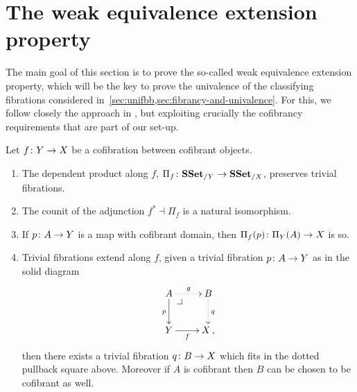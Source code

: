 \documentclass[reqno,10pt,a4paper,oneside,draft]{amsart}
\begin{document}
\section{The weak equivalence extension property}
\label{sec:equep}

The main goal of this section is to prove the so-called weak equivalence extension property, which will be the key to prove the univalence of the classifying fibrations considered in~\cref{sec:unifbb,sec:fibrancy-and-univalence}.  For this, we follow closely the approach in \cite{voevodsky-simplicial-model}, but exploiting crucially the cofibrancy requirements that are part of our set-up.



\begin{lemma}\label{Lemma:ForTheExtProperty} Let  $f \colon Y \rightarrow X$ be a cofibration between
cofibrant objects. 
\begin{enumerate}[$(i)$]
\item The dependent product along $f$, $\Pi_f \colon \mathbf{SSet}_{/Y} \rightarrow \mathbf{SSet}_{/X}$, preserves trivial fibrations.
\item The counit of the adjunction $f^* \dashv \Pi_f$ is a natural isomorphism.
\item If $p \colon A \to Y$ is a map with cofibrant domain, then $\Pi_f(p) \colon \Pi_Y(A) \to X$  is so.
\item Trivial fibrations extend along $f$, \ie given a trivial fibration $p
 \colon A \to Y$  as in the solid diagram
\[
\xymatrix{
A \ar@{.>}[r]^{g} \ar[d]_{p} \drpullback  & B \ar@{.>}[d]^{q} \\
Y \ar[r]_-f &  X \, ,}
\]
then there exists a trivial fibration $q \colon B \rightarrow X$ which fits in the dotted pullback square above. Moreover if $A$ is cofibrant  then 
$B$ can be chosen to be 
cofibrant as well.
\end{enumerate}
\end{lemma}
\end{document}
